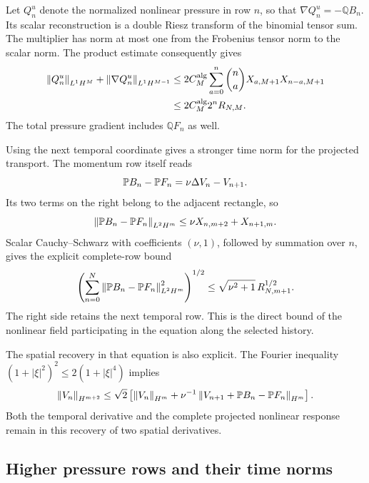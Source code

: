 Let \(Q_n^u\) denote the normalized nonlinear pressure in row \(n\),
so that \(\nabla Q_n^u=-\mathbb Q B_n\).  Its scalar reconstruction
is a double Riesz transform of the binomial tensor sum.  The multiplier
has norm at most one from the Frobenius tensor norm to the scalar
norm.  The product estimate consequently gives
\begin{equation}
 \begin{aligned}
 \left\lVert Q_n^u\right\rVert_{L^1H^M}
 +\left\lVert \nabla Q_n^u\right\rVert_{L^1H^{M-1}}
 &\le 2C_M^{\rm alg}
 \sum_{a=0}^n\binom na X_{a,M+1}X_{n-a,M+1}\\
 &\le 2C_M^{\rm alg}2^nR_{N,M}.
 \end{aligned}
 \label{r:eq:nonlinear-pressure-product-integral}
\end{equation}
The total pressure gradient includes \(\mathbb QF_n\) as well.

Using the next temporal coordinate gives a stronger time norm for the
projected transport.  The momentum row itself reads
\[
 \mathbb P B_n-\mathbb P F_n=\nu\Delta V_n-V_{n+1}.
\]
Its two terms on the right belong to the adjacent rectangle, so
\[
 \left\lVert \mathbb P B_n-\mathbb P F_n\right\rVert_{L^2H^m}
 \le\nu X_{n,m+2}+X_{n+1,m}.
\]
Scalar Cauchy--Schwarz with coefficients \((\nu,1)\), followed by
summation over \(n\), gives the explicit complete-row bound
\begin{equation}
 \left(\sum_{n=0}^N
 \left\lVert \mathbb P B_n-\mathbb P F_n\right\rVert_{L^2H^m}^2\right)^{1/2}
 \le\sqrt{\nu^2+1}\,R_{N,m+1}^{1/2}.
 \label{r:eq:projected-transport-adjacent}
\end{equation}
The right side retains the next temporal row.  This is the direct
bound of the nonlinear field participating in the equation along the
selected history.

The spatial recovery in that equation is also explicit.  The Fourier
inequality \((1+|\xi|^2)^2\le2(1+|\xi|^4)\) implies
\begin{equation}
 \left\lVert V_n\right\rVert_{H^{m+2}}
 \le\sqrt2\left[
 \left\lVert V_n\right\rVert_{H^m}
 +\nu^{-1}\left\lVert V_{n+1}+\mathbb P B_n-\mathbb P F_n\right\rVert_{H^m}\right].
 \label{r:eq:adjacent-spatial-recovery}
\end{equation}
Both the temporal derivative and the complete projected nonlinear
response remain in this recovery of two spatial derivatives.

\subsection{Higher pressure rows and their time norms}


